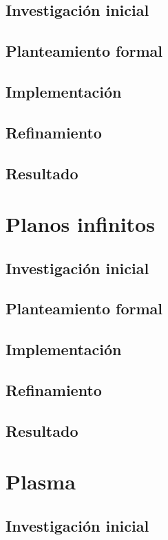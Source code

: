 \subsection{Investigación inicial}
\subsection{Planteamiento formal}
\subsection{Implementación}
\subsection{Refinamiento}
\subsection{Resultado}

\section{Planos infinitos}

\subsection{Investigación inicial}
\subsection{Planteamiento formal}
\subsection{Implementación}
\subsection{Refinamiento}
\subsection{Resultado}

\section{Plasma}

\subsection{Investigación inicial}

